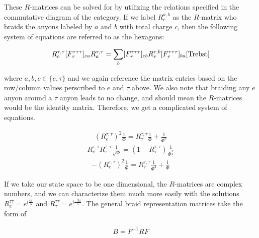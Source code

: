 These $R$-matrices can be solved for by utilizing the relations specified in the commutative diagram of the category. If we label $R^{a,b}_c$ as the $R$-matrix who braids the anyons labeled by $a$ and $b$ with total charge $c$, then the following system of equations are referred to as the hexagons:

\begin{equation}
	\begin{aligned}
		R^{\tau,\tau}_c [F^{\tau\tau\tau}_\tau]_{ca}R^{\tau,\tau}_a = \sum_b [F^{\tau\tau\tau}_\tau]_{cb}R^{\tau,b}_\tau[F^{\tau\tau\tau}_\tau]_{ba} \cite{Trebst}
	\end{aligned}
\end{equation}

where $a,b,c\in\{e,\tau\}$ and we again reference the matrix entries based on the row/column values perscribed to $e$ and $\tau$ above. We also note that braiding any $e$ anyon around a $\tau$ anyon leads to no change, and should mean the $R$-matrices would be the identity matrix. Therefore, we get a complicated system of equations.

\begin{equation}
	\begin{aligned}
		(R^{\tau,\tau}_e)^2\frac{1}{\Phi} = R^{\tau,\tau}_\tau\frac{1}{\Phi} + \frac{1}{\Phi^2}
	\end{aligned}
\end{equation}
\begin{equation}
	\begin{aligned}
		R^{\tau,\tau}_eR^{\tau,\tau}_\tau\frac{1}{\sqrt{\Phi}} = (1-R^{\tau,\tau}_\tau)\frac{1}{\Phi^\frac{3}{2}} 
	\end{aligned}
\end{equation}
\begin{equation}
	\begin{aligned}
		-(R^{\tau,\tau}_e)^2\frac{1}{\Phi} = R^{\tau,\tau}_\tau\frac{1}{\Phi^2}+\frac{1}{\Phi}
	\end{aligned}
\end{equation}

If we take our state space to be one dimensional, the $R$-matrices are complex numbers, and we can characterize them much more easily with the solutions $R^{\tau\tau}_e = e^{i\frac{4\pi}{5}}$ and $R^{\tau\tau}_\tau = e^{i\frac{-3\pi}{5}}$. The general braid representation matrices take the form of 

\begin{equation}
	\begin{aligned}
		B = F^{-1}R F
	\end{aligned}
\end{equation}

